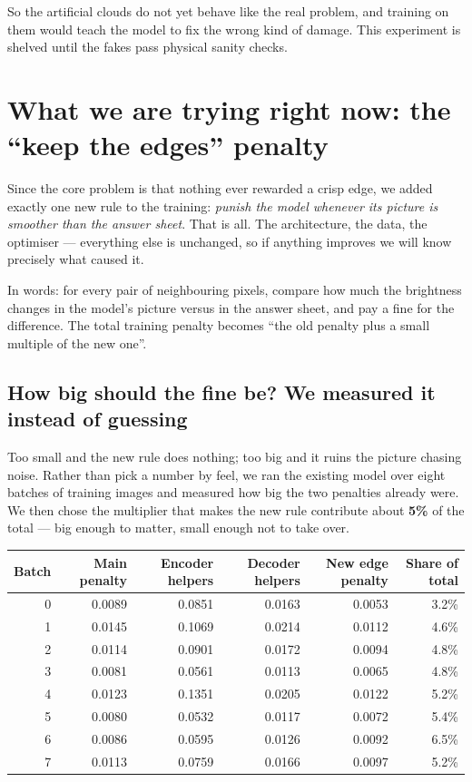 \documentclass[11pt,a4paper]{article}
\begin{document}
So the artificial clouds do not yet behave like the real problem, and training on them would teach
the model to fix the wrong kind of damage. This experiment is shelved until the fakes pass physical
sanity checks.

\section{What we are trying right now: the ``keep the edges'' penalty}

Since the core problem is that nothing ever rewarded a crisp edge, we added exactly one new rule to
the training: \emph{punish the model whenever its picture is smoother than the answer sheet}. That
is all. The architecture, the data, the optimiser --- everything else is unchanged, so if anything
improves we will know precisely what caused it.

In words: for every pair of neighbouring pixels, compare how much the brightness changes in the
model's picture versus in the answer sheet, and pay a fine for the difference. The total training
penalty becomes ``the old penalty plus a small multiple of the new one''.

\subsection{How big should the fine be? We measured it instead of guessing}

Too small and the new rule does nothing; too big and it ruins the picture chasing noise. Rather than
pick a number by feel, we ran the existing model over eight batches of training images and measured
how big the two penalties already were. We then chose the multiplier that makes the new rule
contribute about \textbf{5\%} of the total --- big enough to matter, small enough not to take over.

\begin{center}
\begin{tabular}{@{}rrrrrr@{}}
\hline
Batch & Main penalty & Encoder helpers & Decoder helpers & New edge penalty & Share of total \\
\hline
0 & 0.0089 & 0.0851 & 0.0163 & 0.0053 & 3.2\% \\
1 & 0.0145 & 0.1069 & 0.0214 & 0.0112 & 4.6\% \\
2 & 0.0114 & 0.0901 & 0.0172 & 0.0094 & 4.8\% \\
3 & 0.0081 & 0.0561 & 0.0113 & 0.0065 & 4.8\% \\
4 & 0.0123 & 0.1351 & 0.0205 & 0.0122 & 5.2\% \\
5 & 0.0080 & 0.0532 & 0.0117 & 0.0072 & 5.4\% \\
6 & 0.0086 & 0.0595 & 0.0126 & 0.0092 & 6.5\% \\
7 & 0.0113 & 0.0759 & 0.0166 & 0.0097 & 5.2\% \\
\hline
\end{tabular}
\end{center}
\end{document}
